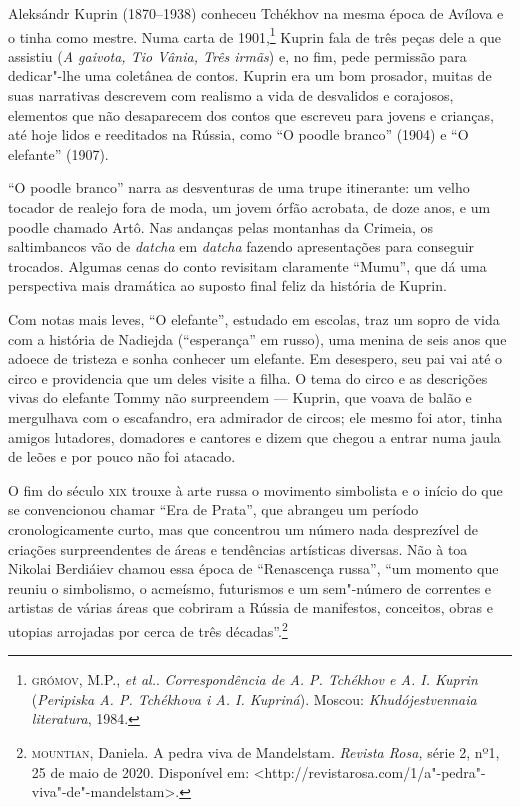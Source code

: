 Aleksándr Kuprin (1870--1938) conheceu Tchékhov na mesma época de
Avílova e o tinha como mestre. Numa carta de 1901,\footnote{\textsc{grómov},
  M.P., \emph{et al.}. \emph{Correspondência de A. P. Tchékhov e A. I. Kuprin} (\emph{Peripiska A. P. Tchékhova i A. I. Kupriná}). Moscou:
  \emph{Khudójestvennaia literatura}, 1984.} Kuprin fala de três peças
dele a que assistiu (\emph{A gaivota, Tio Vânia, Três irmãs}) e, no fim,
pede permissão para dedicar"-lhe uma coletânea de contos. Kuprin era um
bom prosador, muitas de suas narrativas descrevem com realismo a vida de
desvalidos e corajosos, elementos que não desaparecem dos contos que
escreveu para jovens e crianças, até hoje lidos e reeditados na Rússia,
como ``O poodle branco'' (1904) e ``O elefante'' (1907).

``O poodle branco'' narra as desventuras de uma trupe itinerante:
um velho tocador de realejo fora de moda, um jovem órfão acrobata, de
doze anos, e um poodle chamado Artô. Nas andanças pelas montanhas da
Crimeia, os saltimbancos vão de \emph{datcha} em \emph{datcha} fazendo
apresentações para conseguir trocados. Algumas cenas do conto revisitam
claramente ``Mumu'', que dá uma perspectiva mais dramática ao
suposto final feliz da história de Kuprin.

Com notas mais leves, ``O elefante'', estudado em escolas, traz um sopro
de vida com a história de Nadiejda (``esperança'' em russo), uma menina
de seis anos que adoece de tristeza e sonha conhecer um elefante. Em
desespero, seu pai vai até o circo e providencia que um deles visite a
filha. O tema do circo e as descrições vivas do elefante Tommy não
surpreendem --- Kuprin, que voava de balão e mergulhava com o
escafandro, era admirador de circos; ele mesmo foi ator, tinha amigos
lutadores, domadores e cantores e dizem que chegou a entrar numa jaula
de leões e por pouco não foi atacado.

O fim do século \textsc{xix} trouxe à arte russa o movimento simbolista e o
início do que se convencionou chamar ``Era de Prata'', que abrangeu um
período cronologicamente curto, mas que concentrou um número nada
desprezível de criações surpreendentes de áreas e tendências artísticas
diversas. Não à toa Nikolai Berdiáiev chamou essa época de ``Renascença
russa'', ``um momento que reuniu o simbolismo, o acmeísmo, futurismos e
um sem"-número de correntes e artistas de várias áreas que cobriram a
Rússia de manifestos, conceitos, obras e utopias arrojadas por cerca de
três décadas''.\footnote{\textsc{mountian}, Daniela. A pedra viva de Mandelstam.
  \emph{Revista Rosa,} série 2, nº1, 25 de maio de 2020. Disponível em:
  \textless{}http://revistarosa.com/1/a"-pedra"-viva"-de"-mandelstam\textgreater{}.}

